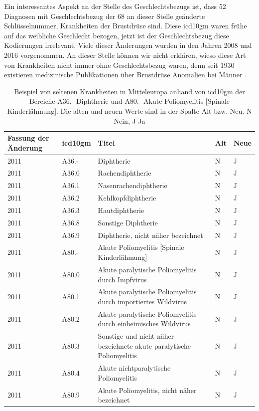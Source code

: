 Ein interessantes Aspekt an der Stelle des Geschlechtsbezugs ist, dass \textsf{52} Diagnosen mit Geschlechtsbezug der \textsf{68} an dieser Stelle geänderte Schlüsselnummer, Krankheiten der Brustdrüse sind. Diese \ac{icd10gm} waren frühe auf das weibliche Geschlecht bezogen, jetzt ist der Geschlechtsbezug diese Kodierungen irrelevant. Viele dieser Änderungen wurden in den Jahren 2008 und 2016 vorgenommen. An dieser Stelle können wir nicht erklären, wieso diese Art von Krankheiten nicht immer ohne Geschlechtsbezug waren, denn seit 1930 existieren medizinische Publikationen über Brustdrüse Anomalien bei Männer \cite{bcm}.

\clearpage

\begin{table}[ht]
	\centering
	\caption[Beispiel von seltenen Krankheiten in Mitteleuropa (Diphtherie und Poliomyelitis)]{Beispiel von seltenen Krankheiten in Mitteleuropa anhand von \ac{icd10gm} der Bereiche \textsf{A36.-} \textsf{Diphtherie} und \textsf{A80.-} \textsf{Akute Poliomyelitis [Spinale Kinderlähmung]}. Die alten und neuen Werte sind in der Spalte \glqq Alt\grqq{} bzw. \glqq Neu\grqq{}. \textsf{N} Nein, \textsf{J} Ja}
	\label{tab:icdeuropa}
	\begin{tabular}{|p{1.6cm}|l|p{7cm}|l|l|}
		\hline
		\rowcolor{lightgray} Fassung der Änderung & \ac{icd10gm} & Titel & Alt & Neue \\ \hline
		\rowcolor{maroon!10} 2011 & A36.- & Diphtherie & N & J \\ \hline
		2011 & A36.0 & Rachendiphtherie & N & J \\ \hline
		2011 & A36.1 & Nasenrachendiphtherie & N & J \\ \hline
		2011 & A36.2 & Kehlkopfdiphtherie & N & J \\ \hline
		2011 & A36.3 & Hautdiphtherie & N & J \\ \hline
		2011 & A36.8 & Sonstige Diphtherie & N & J \\ \hline
		2011 & A36.9 & Diphtherie, nicht näher bezeichnet & N & J \\ \hline \hline
		\rowcolor{maroon!10} 2011 & A80.- & Akute Poliomyelitis [Spinale Kinderlähmung] & N & J \\ \hline
		2011 & A80.0 & Akute paralytische Poliomyelitis durch Impfvirus & N & J \\ \hline
		2011 & A80.1 & Akute paralytische Poliomyelitis durch importiertes Wildvirus & N & J \\ \hline
		2011 & A80.2 & Akute paralytische Poliomyelitis durch einheimisches Wildvirus & N & J \\ \hline
		2011 & A80.3 & Sonstige und nicht näher bezeichnete akute paralytische Poliomyelitis & N & J \\ \hline
		2011 & A80.4 & Akute nichtparalytische Poliomyelitis & N & J \\ \hline
		2011 & A80.9 & Akute Poliomyelitis, nicht näher bezeichnet & N & J \\ \hline
	\end{tabular}
\end{table}

